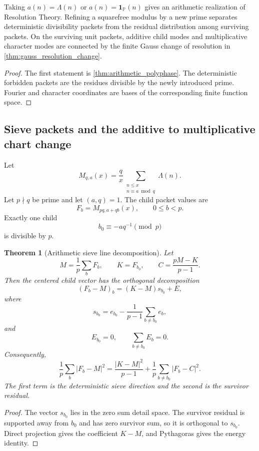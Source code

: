\documentclass{aomart}
\newtheorem{theorem}{Theorem}[section]
\theoremstyle{definition}
\theoremstyle{remark}
\newcommand{\abs}[1]{\left\lvert#1\right\rvert}
\begin{document}
\begin{corollary}\label{cor:prime_packet_realization}
Taking \(a(n)=\Lambda(n)\) or \(a(n)=\mathbf 1_{\mathbb P}(n)\) gives an arithmetic realization of Resolution Theory. Refining a squarefree modulus by a new prime separates deterministic divisibility packets from the residual distribution among surviving packets. On the surviving unit packets, additive child modes and multiplicative character modes are connected by the finite Gauss change of resolution in \cref{thm:gauss_resolution_change}.
\end{corollary}

\begin{proof}
The first statement is \cref{thm:arithmetic_polyphase}. The deterministic forbidden packets are the residues divisible by the newly introduced prime. Fourier and character coordinates are bases of the corresponding finite function space.
\end{proof}

\subsection{Sieve packets and the additive to multiplicative chart change}

Let
\[
 M_{q,a}(x)
 =
 \frac qx
 \sum_{\substack{n\leq x\\n\equiv a\bmod q}}
 \Lambda(n).
\]
Let \(p\nmid q\) be prime and let \((a,q)=1\). The child packet values are
\[
 F_b=M_{pq,a+qb}(x),
 \qquad
 0\leq b<p.
\]
Exactly one child
\[
 b_0\equiv-aq^{-1}\pmod p
\]
is divisible by \(p\).

\begin{theorem}[Arithmetic sieve line decomposition]\label{thm:arithmetic_sieve_line}
Let
\[
 M=\frac1p\sum_bF_b,
 \qquad
 K=F_{b_0},
 \qquad
 C=\frac{pM-K}{p-1}.
\]
Then the centered child vector has the orthogonal decomposition
\[
 \boxed{
 (F_b-M)_b
 =
 (K-M)s_{b_0}+E,
 }
\]
where
\[
 s_{b_0}
 =
 e_{b_0}
 -
 \frac1{p-1}\sum_{b\ne b_0}e_b,
\]
and
\[
 E_{b_0}=0,
 \qquad
 \sum_{b\ne b_0}E_b=0.
\]
Consequently,
\[
 \boxed{
 \frac1p\sum_b\abs{F_b-M}^2
 =
 \frac{\abs{K-M}^2}{p-1}
 +
 \frac1p\sum_{b\ne b_0}\abs{F_b-C}^2.
 }
\]
The first term is the deterministic sieve direction and the second is the survivor residual.
\end{theorem}

\begin{proof}
The vector \(s_{b_0}\) lies in the zero sum detail space. The survivor residual is supported away from \(b_0\) and has zero survivor sum, so it is orthogonal to \(s_{b_0}\). Direct projection gives the coefficient \(K-M\), and Pythagoras gives the energy identity.
\end{proof}
\end{document}
